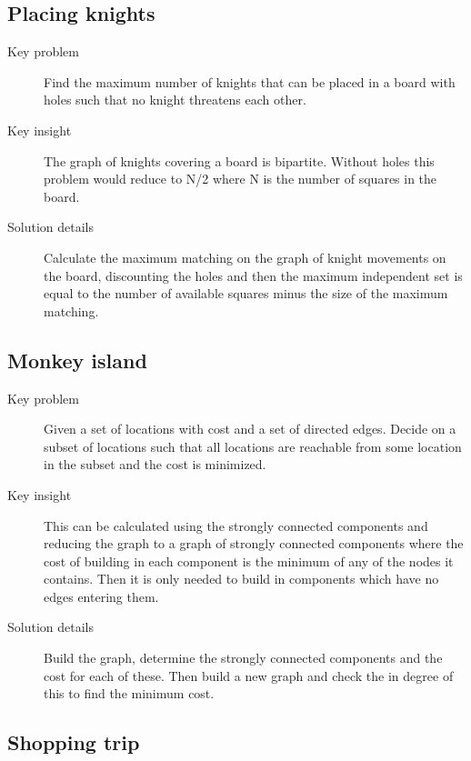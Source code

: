 \documentclass[11pt]{book}
\begin{document}
\subsection{Placing knights}

\begin{description}
	\item[Key problem] Find the maximum number of knights that can be placed in a board with holes such that no knight threatens each other.
	\item[Key insight] The graph of knights covering a board is bipartite. Without holes this problem would reduce to N/2 where N is the number of squares in the board.
	\item[Solution details] Calculate the maximum matching on the graph of knight movements on the board, discounting the holes and then the maximum independent set is equal to the number of available squares minus the size of the maximum matching.
\end{description}

\subsection{Monkey island}

\begin{description}
	\item[Key problem] Given a set of locations with cost and a set of directed edges. Decide on a subset of locations such that all locations are reachable from some location in the subset and the cost is minimized.
	\item[Key insight] This can be calculated using the strongly connected components and reducing the graph to a graph of strongly connected components where the cost of building in each component is the minimum of any of the nodes it contains. Then it is only needed to build in components which have no edges entering them.
	\item[Solution details] Build the graph, determine the strongly connected components and the cost for each of these. Then build a new graph and check the in degree of this to find the minimum cost.
\end{description}

\subsection{Shopping trip}
\end{document}
